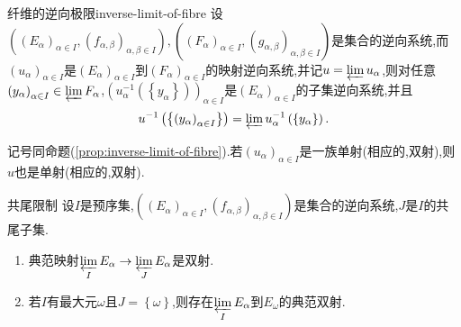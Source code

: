 \begin{proposition}{纤维的逆向极限}{inverse-limit-of-fibre}
	设$\left(\left(E_{\alpha}\right)_{\alpha\in I},\left(f_{\alpha,\beta}\right)_{\alpha,\beta\in I}\right),\left(\left(F_{\alpha}\right)_{\alpha\in I},\left(g_{\alpha,\beta}\right)_{\alpha,\beta\in I}\right)$是集合的逆向系统,而$\left(u_{\alpha}\right)_{\alpha\in I}$是$\left(E_{\alpha}\right)_{\alpha\in I}$到$\left(F_{\alpha}\right)_{\alpha\in I}$的映射逆向系统,并记$u=\varprojlim u_{\alpha}$,则对任意$\left(y_{\alpha}\right)_{\alpha\in I}\in\varprojlim F_{\alpha}$,$\left(u_{\alpha}^{-1}\left(\left\{y_{\alpha}\right\}\right)\right)_{\alpha\in I}$是$\left(E_{\alpha}\right)_{\alpha\in I}$的子集逆向系统,并且
	\begin{align*}
		u^{-1}\left(\left\{\left(y_{\alpha}\right)_{\alpha\in I}\right\}\right)=\varprojlim u_{\alpha}^{-1}\left(\left\{y_{\alpha}\right\}\right).
	\end{align*}
\end{proposition}

\begin{corollary}{}{}
	记号同命题(\ref{prop:inverse-limit-of-fibre}).若$\left(u_{\alpha}\right)_{\alpha\in I}$是一族单射(相应的,双射),则$u$也是单射(相应的,双射).
\end{corollary}

\begin{proposition}{共尾限制}{}
	设$I$是预序集,$\left(\left(E_{\alpha}\right)_{\alpha\in I},\left(f_{\alpha,\beta}\right)_{\alpha,\beta\in I}\right)$是集合的逆向系统,$J$是$I$的共尾子集.
	\begin{enumerate}
		\item 典范映射$\varprojlim\limits_{I}E_{\alpha}\to\varprojlim\limits_{J}E_{\alpha}$是双射.
		\item 若$I$有最大元$\omega$且$J=\left\{\omega\right\}$,则存在$\varprojlim\limits_{I}E_{\alpha}$到$E_{\omega}$的典范双射.
	\end{enumerate}
\end{proposition}

